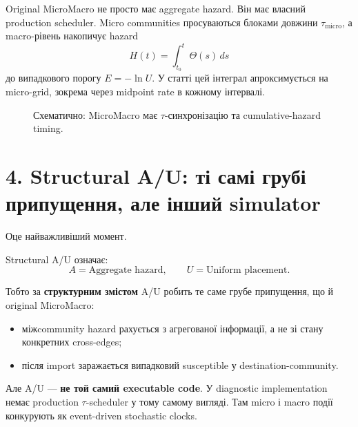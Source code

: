\documentclass[11pt,a4paper]{article}
\begin{document}
Original MicroMacro не просто має aggregate hazard. Він має власний production scheduler. Micro communities просуваються блоками довжини $\tau_{\text{micro}}$, а macro-рівень накопичує hazard
\[
 H(t)=\int_{t_0}^{t}\Theta(s)\,ds
\]
до випадкового порогу $E=-\ln U$. У статті цей інтеграл апроксимується на micro-grid, зокрема через midpoint rate в кожному інтервалі.

\begin{figure}[h!]
\centering
{}
\caption{Схематично: MicroMacro має $\tau$-синхронізацію та cumulative-hazard timing.}
\end{figure}

\section*{4. Structural A/U: ті самі грубі припущення, але інший simulator}

Оце найважливіший момент.

Structural A/U означає:
\[
 \boxed{A=\text{Aggregate hazard}},\qquad
 \boxed{U=\text{Uniform placement}}.
\]

Тобто за \textbf{структурним змістом} A/U робить те саме грубе припущення, що й original MicroMacro:
\begin{itemize}[nosep]
\item міжcommunity hazard рахується з агрегованої інформації, а не зі стану конкретних cross-edges;
\item після import заражається випадковий susceptible у destination-community.
\end{itemize}

Але A/U --- \textbf{не той самий executable code}. У diagnostic implementation немає production $\tau$-scheduler у тому самому вигляді. Там micro і macro події конкурують як event-driven stochastic clocks.
\end{document}
